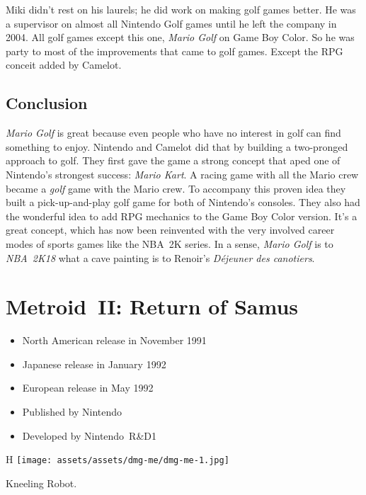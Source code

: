 \documentclass{book}
\begin{document}
Miki didn’t rest on his laurels; he did work on making golf games better. He was a supervisor on almost all Nintendo Golf games until he left the company in 2004. All golf games except this one, \emph{Mario Golf} on Game Boy Color. So he was party to most of the improvements that came to golf games. Except the RPG conceit added by Camelot.

\FloatBarrier\needspace{5pt}\section*{Conclusion}\nopagebreak[4]

\emph{Mario Golf} is great because even people who have no interest in golf can find something to enjoy. Nintendo and Camelot did that by building a two-pronged approach to golf. They first gave the game a strong concept that aped one of Nintendo’s strongest success: \emph{Mario Kart}. A racing game with all the Mario crew became a \emph{golf} game with the Mario crew. To accompany this proven idea they built a pick-up-and-play golf game for both of Nintendo’s consoles. They also had the wonderful idea to add RPG mechanics to the Game Boy Color version. It’s a great concept, which has now been reinvented with the very involved career modes of sports games like the NBA 2K series. In a sense, \emph{Mario Golf} is to \emph{NBA 2K18} what a cave painting is to Renoir’s \emph{Déjeuner des canotiers}.


\begingroup \chapter*{Metroid II: Return of Samus} \endgroup

\begin{itemize} \setlength\itemsep{-0.4em}
\item North American release in November 1991
\item Japanese release in January 1992
\item European release in May 1992
\item Published by Nintendo
\item Developed by Nintendo R\&D1
\end{itemize}\noindent

\begin{wrapfigure}{H}{\linewidth}
\vskip 4pt
\centering \texttt{[image: assets/assets/dmg-me/dmg-me-1.jpg]}\par\pagetwodescription Kneeling Robot.\end{wrapfigure}
\clearpage
\end{document}
